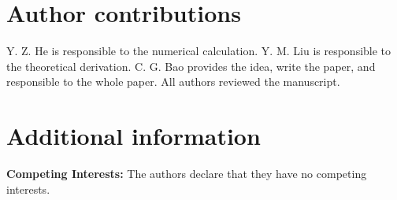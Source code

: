 \documentclass[10pt]{wlscirep}
\begin{document}
\section*{Author contributions}

Y. Z. He is responsible to the numerical calculation. Y. M. Liu is
responsible to the theoretical derivation. C. G. Bao provides the idea,
write the paper, and responsible to the whole paper. All authors reviewed
the manuscript.



\section*{Additional information}

\textbf{Competing Interests:} The authors declare that they have no
competing interests.
\end{document}
